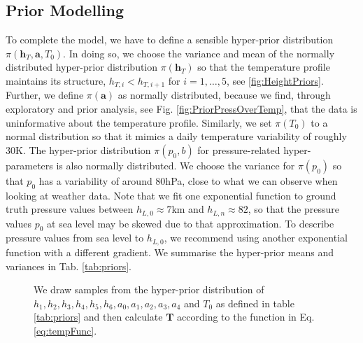 \subsection{Prior Modelling}
To complete the model, we have to define a sensible hyper-prior distribution $\pi(\bm{h}_T, \bm{a}, T_0)$.
In doing so, we choose the variance and mean of the normally distributed hyper-prior distribution $\pi(\bm{h}_T)$ so that the temperature profile maintains its structure, $ h_{T, i} < h_{T, i+1}$ for $i = 1,\dots, 5$, see \ref{fig:HeightPriors}.
Further, we define $\pi(\bm{a})$ as normally distributed, because we find, through exploratory and prior analysis, see Fig. \ref{fig:PriorPressOverTemp}, that the data is uninformative about the temperature profile.
Similarly, we set $\pi(T_0)$ to a normal distribution so that it mimics a daily temperature variability of roughly 30K.
The hyper-prior distribution $\pi(p_0, b)$ for pressure-related hyper-parameters is also normally distributed.
We choose the variance for $\pi(p_0)$ so that $p_0$ has a variability of around 80hPa, close to what we can observe when looking at weather data.
Note that we fit one exponential function to ground truth pressure values between $h_{L,0} \approx 7$km and $h_{L,n} \approx 82$, so that the pressure values $p_0$ at sea level may be skewed due to that approximation.
To describe pressure values from sea level to $h_{L,0}$, we recommend using another exponential function with a different gradient.
We summarise the hyper-prior means and variances in Tab. \ref{tab:priors}.
\begin{figure}[ht!]
	\centering
	
	\caption[Prior Samples of $\bm{T}$ according to the respective hyper-prior distribution.]{We draw samples from the hyper-prior distribution of $h_1, h_2,h_3,h_4,h_5,h_6, a_0, a_1, a_2,a_3,a_4$ and $T_0$ as defined in table \ref{tab:priors} and then calculate $\bm{T}$ according to the function in Eq. \ref{eq:tempFunc}.}
	\label{fig:PriorTemp}
\end{figure}

